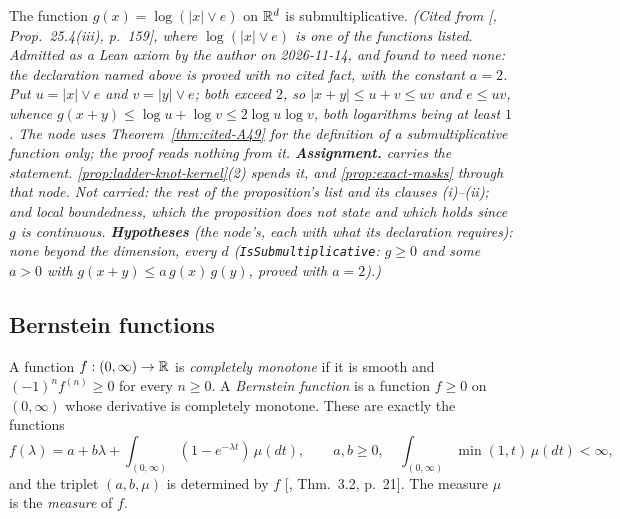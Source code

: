 \begin{theorem}
\label{thm:cited-A50}
\leanok
{}
The function $g(x) = \log(|x| \vee e)$ on $\mathbb{R}^d$ is submultiplicative.
\statusA\quad{}\quad\emph{(Cited from [, Prop.~25.4(iii), p.~159],
where $\log(|x| \vee e)$ is one of the functions listed. Admitted as a Lean axiom by the author on
2026-11-14, and found to need none: the declaration named above is proved with no cited fact, with
the constant $a = 2$. Put $u = |x| \vee e$ and $v = |y| \vee e$; both exceed $2$, so
$|x + y| \le u + v \le uv$ and $e \le uv$, whence $g(x + y) \le \log u + \log v \le 2\log u\log v$,
both logarithms being at least $1$. The node uses Theorem~\ref{thm:cited-A49} for the definition of a
submultiplicative function only; the proof reads nothing from it. \textbf{Assignment.} 
carries the statement.
\ref{prop:ladder-knot-kernel}(2) spends it, and \ref{prop:exact-masks} through that node. Not
carried: the rest of the
proposition's list and its clauses (i)--(ii); and local boundedness, which the proposition does not
state and which holds since $g$ is continuous.
\textbf{Hypotheses} (the node's, each with what its declaration requires): none beyond the dimension,
every $d$ (\texttt{IsSubmultiplicative}: $g \ge 0$ and some $a > 0$ with
$g(x + y) \le a\,g(x)\,g(y)$, proved with $a = 2$).)}
\end{theorem}

\subsection{Bernstein functions}
\label{subsec:cited-bernstein}

A function $f : (0,\infty) \to \mathbb{R}$ is \emph{completely monotone} if it is smooth
and $(-1)^nf^{(n)} \ge 0$ for every $n \ge 0$. A \emph{Bernstein function} is a
function $f \ge 0$ on $(0,\infty)$ whose derivative is completely monotone. These are exactly the
functions
\[
  f(\lambda) = a + b\lambda + \int_{(0,\infty)}(1 - e^{-\lambda t})\,\mu(dt), \qquad a, b \ge 0,
  \quad \int_{(0,\infty)}\min(1, t)\,\mu(dt) < \infty,
\]
and the triplet $(a, b, \mu)$ is determined by $f$ [, Thm.~3.2,
p.~21]. The measure $\mu$ is the \emph{\Levy{} measure} of $f$.

